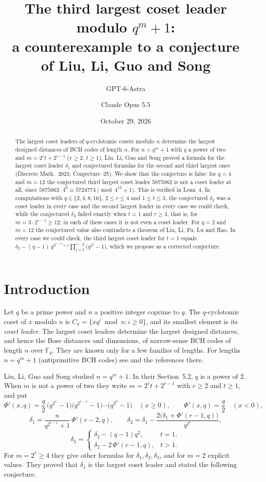 \documentclass[11pt]{amsart}
\title[The third largest coset leader]{The third largest coset leader modulo $q^m+1$:\\ a counterexample to a conjecture of Liu, Li, Guo and Song}
\author{GPT-6-Astra}
\author{Claude Opus 5.5}
\date{October 29, 2026}
\theoremstyle{remark}
\begin{document}
\begin{abstract}
The largest coset leaders of $q$-cyclotomic cosets modulo $n$ determine the largest designed distances of BCH codes of length $n$.
For $n=q^m+1$ with $q$ a power of two and $m=2^rt+2^{r-1}$ ($r\ge2$, $t\ge1$), Liu, Li, Guo and Song proved a formula for the largest coset leader $\delta_1$ and conjectured formulas for the second and third largest ones (Discrete Math.\ 2023, Conjecture~25).
We show that the conjecture is false: for $q=4$ and $m=12$ the conjectured third largest coset leader $5875062$ is not a coset leader at all, since $5875062\cdot 4^6\equiv 5724774\pmod{4^{12}+1}$.
This is verified in Lean~4.
In computations with $q\in\{2,4,8,16\}$, $2\le r\le4$ and $1\le t\le3$, the conjectured $\delta_2$ was a coset leader in every case and the second largest leader in every case we could check, while the conjectured $\delta_3$ failed exactly when $t=1$ and $r\ge3$, that is, for $m=3\cdot2^{r-1}\ge12$; in each of these cases it is not even a coset leader.
For $q=2$ and $m=12$ the conjectured value also contradicts a theorem of Liu, Li, Fu, Lu and Rao.
In every case we could check, the third largest coset leader for $t=1$ equals $\delta_2-(q-1)\,q^{2^{r-2}+1}\prod_{j=1}^{r-2}\bigl(q^{2^j}-1\bigr)$, which we propose as a corrected conjecture.
\end{abstract}

\maketitle

\section{Introduction}

Let $q$ be a prime power and $n$ a positive integer coprime to $q$.
The $q$-cyclotomic coset of $x$ modulo $n$ is $C_x=\{xq^i\bmod n: i\ge0\}$, and its smallest element is its \emph{coset leader}.
The largest coset leaders determine the largest designed distances, and hence the Bose distances and dimensions, of narrow-sense BCH codes of length $n$ over $\mathbb{F}_q$.
They are known only for a few families of lengths.
For lengths $n=q^m+1$ (antiprimitive BCH codes) see \cite{LLGS,LLFLR,ZC} and the references there.

Liu, Li, Guo and Song \cite{LLGS} studied $n=q^m+1$.
In their Section~5.2, $q$ is a power of $2$.
When $m$ is not a power of two they write $m=2^rt+2^{r-1}$ with $r\ge2$ and $t\ge1$, and put
\[
\Phi'(x,q)=\frac q2\,\bigl(q^{2^x}-1\bigr)\bigl(q^{2^{x-1}}-1\bigr)\cdots\bigl(q^{2^0}-1\bigr)\quad(x\ge0),\qquad \Phi'(x,q)=\frac q2\quad(x<0),
\]
\[
\delta_1=\frac{n}{q^{2^{r-1}}+1}\,\Phi'(r-2,q),\qquad
\delta_2=\delta_1-\frac{2\bigl(\delta_1+\Phi'(r-1,q)\bigr)}{q^{2^r}},
\]
\[
\delta_3=\begin{cases}\delta_2-(q-1)q^2, & t=1,\\ \delta_2-2\,\Phi'(r-1,q), & t>1.\end{cases}
\]
For $m=2^r\ge4$ they give other formulas for $\delta_1,\delta_2,\delta_3$, and for $m=2$ explicit values.
They proved that $\delta_1$ is the largest coset leader \cite[Theorem~24]{LLGS} and stated the following conjecture.
\end{document}
